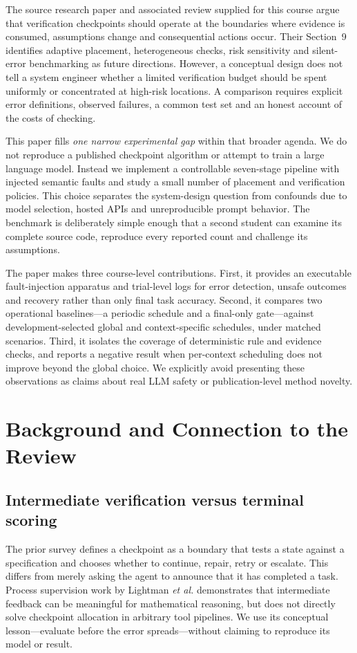 \documentclass[conference]{IEEEtran}
\begin{document}
The source research paper and associated review supplied for this course \cite{agrawal2026survey,agrawal2026review} argue that verification checkpoints should operate at the boundaries where evidence is consumed, assumptions change and consequential actions occur. Their Section~9 identifies adaptive placement, heterogeneous checks, risk sensitivity and silent-error benchmarking as future directions. However, a conceptual design does not tell a system engineer whether a limited verification budget should be spent uniformly or concentrated at high-risk locations. A comparison requires explicit error definitions, observed failures, a common test set and an honest account of the costs of checking.

This paper fills \emph{one narrow experimental gap} within that broader agenda. We do not reproduce a published checkpoint algorithm or attempt to train a large language model. Instead we implement a controllable seven-stage pipeline with injected semantic faults and study a small number of placement and verification policies. This choice separates the system-design question from confounds due to model selection, hosted APIs and unreproducible prompt behavior. The benchmark is deliberately simple enough that a second student can examine its complete source code, reproduce every reported count and challenge its assumptions.

The paper makes three course-level contributions. First, it provides an executable fault-injection apparatus and trial-level logs for error detection, unsafe outcomes and recovery rather than only final task accuracy. Second, it compares two operational baselines---a periodic schedule and a final-only gate---against development-selected global and context-specific schedules, under matched scenarios. Third, it isolates the coverage of deterministic rule and evidence checks, and reports a negative result when per-context scheduling does not improve beyond the global choice. We explicitly avoid presenting these observations as claims about real LLM safety or publication-level method novelty.

\section{Background and Connection to the Review}
\subsection{Intermediate verification versus terminal scoring}
The prior survey defines a checkpoint as a boundary that tests a state against a specification and chooses whether to continue, repair, retry or escalate. This differs from merely asking the agent to announce that it has completed a task. Process supervision work by Lightman \emph{et al.} \cite{lightman2024verify} demonstrates that intermediate feedback can be meaningful for mathematical reasoning, but does not directly solve checkpoint allocation in arbitrary tool pipelines. We use its conceptual lesson---evaluate before the error spreads---without claiming to reproduce its model or result.
\end{document}
